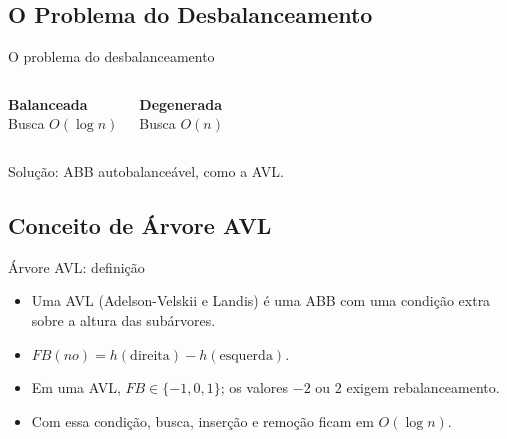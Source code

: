 \documentclass[aspectratio=43,10pt]{beamer}
\begin{document}
\subsection{O Problema do Desbalanceamento}
\begin{frame}{O problema do desbalanceamento}
  \begin{columns}
    \centering
    \textbf{Balanceada}\\\scriptsize Busca $O(\log n)$\\[1mm]
    \centering
    \textbf{Degenerada}\\\scriptsize Busca $O(n)$\\[1mm]
  \end{columns}
  \vfill\centering
  \alert{Solução: ABB autobalanceável, como a AVL.}
\end{frame}

\subsection{Conceito de Árvore AVL}
\begin{frame}{Árvore AVL: definição}
  \begin{itemize}
    \item Uma AVL (Adelson-Velskii e Landis) é uma ABB com uma condição extra sobre a altura das subárvores.
    \item $FB(no)=h(\text{direita})-h(\text{esquerda})$.
    \item Em uma AVL, $FB\in\{-1,0,1\}$; os valores $-2$ ou $2$ exigem rebalanceamento.
    \item Com essa condição, busca, inserção e remoção ficam em $O(\log n)$.
  \end{itemize}
\end{frame}
\end{document}
